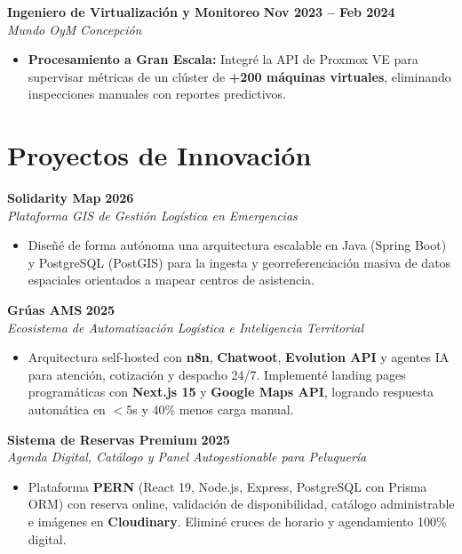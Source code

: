 \documentclass[a4paper,10pt]{article}
\begin{document}
\vspace{0.2cm}

\noindent \textbf{Ingeniero de Virtualización y Monitoreo} \hfill \textbf{Nov 2023 -- Feb 2024} \\
\textit{Mundo OyM} \hfill \textit{Concepción}
\begin{itemize}[leftmargin=*, noitemsep, topsep=2pt]
    \item \textbf{Procesamiento a Gran Escala:} Integré la API de Proxmox VE para supervisar métricas de un clúster de \textbf{+200 máquinas virtuales}, eliminando inspecciones manuales con reportes predictivos.
\end{itemize}

\section{Proyectos de Innovación}

\noindent \textbf{Solidarity Map} \hfill \textbf{2026} \\
\textit{Plataforma GIS de Gestión Logística en Emergencias} 
\begin{itemize}[leftmargin=*, noitemsep]
    \item Diseñé de forma autónoma una arquitectura escalable en Java (Spring Boot) y PostgreSQL (PostGIS) para la ingesta y georreferenciación masiva de datos espaciales orientados a mapear centros de asistencia.
\end{itemize}

\vspace{0.2cm}

\noindent \textbf{Grúas AMS} \hfill \textbf{2025} \\
\textit{Ecosistema de Automatización Logística e Inteligencia Territorial} 
\begin{itemize}[leftmargin=*, noitemsep]
    \item Arquitectura self-hosted con \textbf{n8n}, \textbf{Chatwoot}, \textbf{Evolution API} y agentes IA para atención, cotización y despacho 24/7. Implementé landing pages programáticas con \textbf{Next.js 15} y \textbf{Google Maps API}, logrando respuesta automática en $<$5s y 40\% menos carga manual.
\end{itemize}

\vspace{0.2cm}

\noindent \textbf{Sistema de Reservas Premium} \hfill \textbf{2025} \\
\textit{Agenda Digital, Catálogo y Panel Autogestionable para Peluquería} 
\begin{itemize}[leftmargin=*, noitemsep]
    \item Plataforma \textbf{PERN} (React 19, Node.js, Express, PostgreSQL con Prisma ORM) con reserva online, validación de disponibilidad, catálogo administrable e imágenes en \textbf{Cloudinary}. Eliminé cruces de horario y agendamiento 100\% digital.
\end{itemize}
\end{document}
